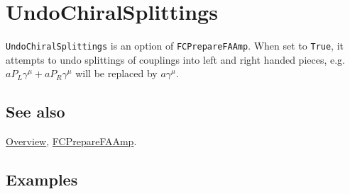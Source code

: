 \documentclass[../FeynCalcManual.tex]{subfiles}
\begin{document}
\hypertarget{undochiralsplittings}{%
\section{UndoChiralSplittings}\label{undochiralsplittings}}

\texttt{UndoChiralSplittings} is an option of \texttt{FCPrepareFAAmp}.
When set to \texttt{True}, it attempts to undo splittings of couplings
into left and right handed pieces,
e.g.~\(a P_L \gamma^\mu + a P_R \gamma^\mu\) will be replaced by
\(a \gamma^\mu\).

\subsection{See also}

\hyperlink{toc}{Overview}, \hyperlink{fcpreparefaamp}{FCPrepareFAAmp}.

\subsection{Examples}
\end{document}
